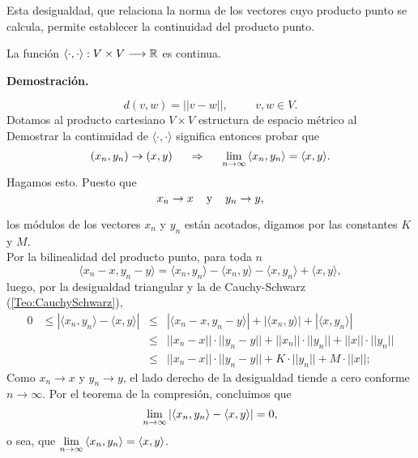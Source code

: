 Esta desigualdad, que relaciona la norma de los
vectores cuyo producto punto se calcula, permite
establecer la continuidad del producto punto. \\


\begin{prop} \label{prop: continuidad del producto punto}
La función $\langle  \cdot , \cdot \rangle :
V \times V \longrightarrow \mathbb{R} $ es continua.
\end{prop}
\noindent
\textbf{Demostración.}

\[
d(v,w)= ||v-w||, \hspace{1cm} v, w \in V.
\]
Dotamos al producto cartesiano $V \times V $
estructura de espacio métrico al  \\


Demostrar la continuidad de 
$\langle  \cdot , \cdot \rangle$ significa entonces
probar que
\[
(x_{n}, y_{n}) \rightarrow (x,y) \hspace{0.5cm}
\Rightarrow \hspace{0.5cm} \lim\limits_{n \rightarrow \infty}{
\langle  x_{n} , y_{n} \rangle} = \langle  x , y \rangle .
\]
Hagamos esto. Puesto que
\[
x_{n} \rightarrow x \hspace{0.4cm} \text{y}
\hspace{0.4cm} y_{n} \rightarrow y, 
\]

\noindent
los módulos de los vectores $x_{n}$ y $y_{n}$ 
están acotados, digamos por las constantes $K$ y $M$. \\
Por la bilinealidad del producto punto, para toda $n$
\[
\langle x_{n}-x , y_{n}-y \rangle =
\langle x_{n}, y_{n}\rangle -
\langle x_{n} , y \rangle -
\langle x , y_{n} \rangle +
\langle x , y \rangle ,
\]
\noindent
luego, por la desigualdad triangular y la de Cauchy-Schwarz
(\ref{Teo:CauchySchwarz}),
\begin{align*}
0 & \leq |\langle x_{n}, y_{n}\rangle - \langle x , y \rangle|
& \leq & |\langle x_{n}-x , y_{n}-y \rangle| +
|\langle x_{n} , y \rangle| + |\langle x , y_{n} \rangle| \\
&& \leq & ||x_{n}-x|| \cdot ||y_{n}-y|| + ||x_{n}||\cdot ||y_{n}||
+||x|| \cdot ||y_{n}|| \\
&& \leq & ||x_{n}-x|| \cdot ||y_{n}-y|| + K\cdot ||y_{n}||
+M \cdot ||x||; 
\end{align*}
Como $x_{n} \rightarrow x$ y $y_{n} \rightarrow y$,
el lado derecho de la desigualdad tiende a cero
conforme $n \rightarrow \infty$. Por el teorema de la compresión,
concluimos que
\[
\lim\limits_{n \rightarrow \infty}{|\langle x_{n}, y_{n}\rangle - \langle x , y \rangle|}=0,
\]
o sea, que 
$ \lim\limits_{n \rightarrow \infty}{
\langle  x_{n} , y_{n} \rangle} = \langle  x , y \rangle$.
\QEDB
\vspace{0.2cm}


